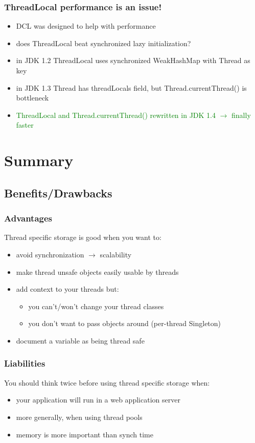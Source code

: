 \documentclass{beamer}
\begin{document}
\begin{frame}
  \frametitle{ThreadLocal performance is an issue!}

\begin{itemize}
\item DCL was designed to help with performance
\item does ThreadLocal beat synchronized lazy initialization?
\pause
\item \alert{in JDK 1.2 ThreadLocal uses synchronized WeakHashMap with Thread as key}
\pause
\item \alert{in JDK 1.3 Thread has threadLocals field, but Thread.currentThread() is bottleneck}
\pause
\item \textcolor{green}{ThreadLocal and Thread.currentThread() rewritten in JDK 1.4 $\rightarrow$ finally faster}
\end{itemize}

\end{frame}

\section{Summary}

\subsection{Benefits/Drawbacks}

\begin{frame}
  \frametitle{Advantages}

Thread specific storage is good when you want to:
\begin{itemize}
\item avoid synchronization $\rightarrow$ scalability
\item make thread unsafe objects easily usable by threads
\item add context to your threads but:
\begin{itemize}
\item you can't/won't change your thread classes
\item you don't want to pass objects around (per-thread Singleton)
\end{itemize}
\item document a variable as being thread safe
\end{itemize}

\end{frame}

\begin{frame}
  \frametitle{Liabilities}

You should think twice before using thread specific storage when:
\begin{itemize}
\item your application will run in a web application server
\item more generally, when using thread pools
\item memory is more important than synch time
\end{itemize}

\end{frame}
\end{document}
